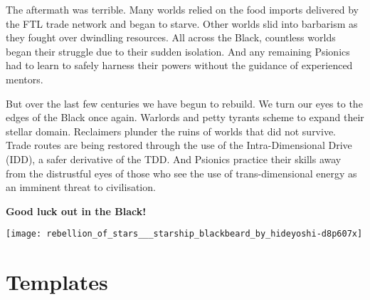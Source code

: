 \documentclass[10pt,twoside]{article}
\begin{document}
\begin{multicols}{2}
  The aftermath was terrible. Many worlds relied on the food imports delivered by the FTL trade network and began to starve. Other worlds slid into barbarism as they fought over dwindling resources. All across the Black, countless worlds began their struggle due to their sudden isolation. And any remaining Psionics had to learn to safely harness their powers without the guidance of experienced mentors.

  But over the last few centuries we have begun to rebuild. We turn our eyes to the edges of the Black once again. Warlords and petty tyrants scheme to expand their stellar domain. Reclaimers plunder the ruins of worlds that did not survive. Trade routes are being restored through the use of the Intra-Dimensional Drive (IDD), a safer derivative of the TDD. And Psionics practice their skills away from the distrustful eyes of those who see the use of trans-dimensional energy as an imminent threat to civilisation.

  \textbf{Good luck out in the Black!}

  \vspace{\baselineskip}

  \texttt{[image: rebellion\_of\_stars\_\_\_starship\_blackbeard\_by\_hideyoshi-d8p607x]}
  

  \newpage

  \tableofcontents
  
  \end{multicols}
  
  
  
  
  
  
  
  
  
  
  
  
  \section{Templates}
  
\end{document}
